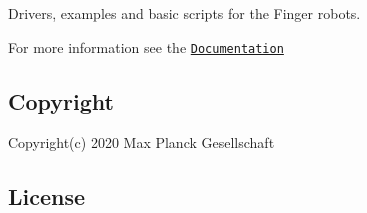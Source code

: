Drivers, examples and basic scripts for the Finger robots.

For more information see the \href{https://open-dynamic-robot-initiative.github.io/code_documentation/robot_fingers/docs/doxygen/html/index.html}{\tt Documentation}

\subsection*{Copyright}

Copyright(c) 2020 Max Planck Gesellschaft

\subsection*{License}

